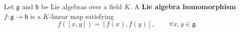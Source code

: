 Let $\mathfrak{g}$ and $\mathfrak{h}$ be Lie algebras over a field $K$. A \textbf{Lie algebra homomorphism} $f : \mathfrak{g} \to \mathfrak{h}$ is a $K$-linear map satisfying
$$
f([x, y]) = [f(x), f(y)], \qquad \forall x, y \in \mathfrak{g}.
$$
